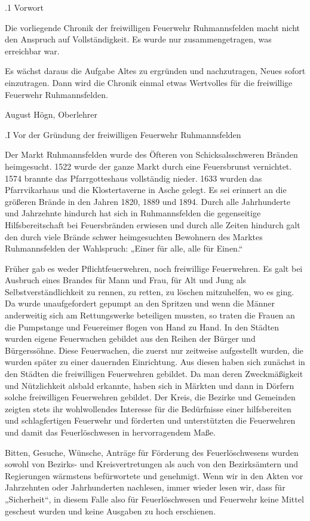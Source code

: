 \documentclass{book}
\begin{document}
.1 Vorwort

Die vorliegende Chronik der freiwilligen Feuerwehr Ruhmannsfelden macht nicht
den Anspruch auf Vollständigkeit. Es wurde nur zusammengetragen, was erreichbar
war.

Es wächst daraus die Aufgabe Altes zu ergründen und nachzutragen, Neues sofort
einzutragen. Dann wird die Chronik einmal etwas Wertvolles für die freiwillige
Feuerwehr Ruhmannsfelden.



August Högn, Oberlehrer

.I Vor der Gründung der freiwilligen Feuerwehr Ruhmannsfelden

Der Markt Ruhmannsfelden wurde des Öfteren von Schicksalsschweren Bränden
heimgesucht. 1522 wurde der ganze Markt durch eine Feuersbrunst vernichtet. 1574
brannte das Pfarrgotteshaus vollständig nieder. 1633 wurden das Pfarrvikarhaus
und die Klostertaverne in Asche gelegt. Es sei erinnert an die größeren Brände
in den Jahren 1820, 1889 und 1894. Durch alle Jahrhunderte und Jahrzehnte
hindurch hat sich in Ruhmannsfelden die gegenseitige Hilfsbereitschaft bei
Feuersbränden erwiesen und durch alle Zeiten hindurch galt den durch viele
Brände schwer heimgesuchten Bewohnern des Marktes Ruhmannsfelden der Wahlspruch:
„Einer für alle, alle für Einen.“

Früher gab es weder Pflichtfeuerwehren, noch freiwillige Feuerwehren. Es galt
bei Ausbruch eines Brandes für Mann und Frau, für Alt und Jung als
Selbstverständlichkeit zu rennen, zu retten, zu löschen mitzuhelfen, wo es ging.
Da wurde unaufgefordert gepumpt an den Spritzen und wenn die Männer anderweitig
sich am Rettungswerke beteiligen mussten, so traten die Frauen an die Pumpstange
und Feuereimer flogen von Hand zu Hand. In den Städten wurden eigene Feuerwachen
gebildet aus den Reihen der Bürger und Bürgerssöhne. Diese Feuerwachen, die
zuerst nur zeitweise aufgestellt wurden, die wurden später zu einer dauernden
Einrichtung. Aus diesen haben sich zunächst in den Städten die freiwilligen
Feuerwehren gebildet. Da man deren Zweckmäßigkeit und Nützlichkeit alsbald
erkannte, haben sich in Märkten und dann in Dörfern solche freiwilligen
Feuerwehren gebildet. Der Kreis, die Bezirke und Gemeinden zeigten stets ihr
wohlwollendes Interesse für die Bedürfnisse einer hilfsbereiten und
schlagfertigen Feuerwehr und förderten und unterstützten die Feuerwehren und
damit das Feuerlöschwesen in hervorragendem Maße.

Bitten, Gesuche, Wünsche, Anträge für Förderung des Feuerlöschwesens wurden
sowohl von Bezirks- und Kreisvertretungen als auch von den Bezirksämtern und
Regierungen wärmstens befürwortete und genehmigt. Wenn wir in den Akten vor
Jahrzehnten oder Jahrhunderten nachlesen, immer wieder lesen wir, dass für
„Sicherheit“, in diesem Falle also für Feuerlöschwesen und Feuerwehr keine
Mittel gescheut wurden und keine Ausgaben zu hoch erschienen.
\end{document}
